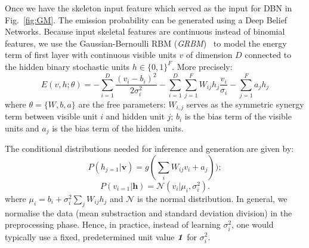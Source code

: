 Once we have the skeleton input feature \skfeature{} which served as the input \randomvariableSK{} for DBN in Fig.~\ref{fig:GM}. The emission probability \emissionprob{} can be generated using a Deep Belief Networks.
Because input skeletal features \skfeature{} are continuous instead of binomial features, we use the Gaussian-Bernoulli RBM (\emph{GRBM})~\cite{salakhutdinov2009learning} to model the energy term of first layer with continuous visible units $v$ of dimension $D$ connected to the hidden binary stochastic units $h\in \{0,1\}^F$. More precisely:
\begin{equation}
    E(v,h;\theta) =-\sum^D_{i=1} \frac{(v_i-b_i)^2}{2\sigma_i^2} -\sum^D_{i=1} \sum^F_{j=1} W_{ij}  h_j \frac{v_i}{\sigma_i}- \sum^F_{j=1}a_jh_j
\label{GRBMenergy}
\end{equation}
where $\theta=\{W,b,a\}$ are the free parameters: $W_{i,j}$ serves as the symmetric synergy term between visible unit $i$ and hidden unit $j$; $b_i$ is the bias term of the visible units and $a_j$ is the bias term of the hidden units.

The conditional distributions needed for inference and generation are given by:
\begin{equation}
    P(h_{j=1}|\textbf{v})=g(\sum_i W_{ij}v_i+a_j));
\end{equation}
\begin{equation}
    P(v_{i=1}|\textbf{h})=\mathscr{N}(v_i|\mu_i,\sigma_i^2).
\end{equation}
where $\mu_i=b_i+\sigma_i^2 \sum_j W_{ij} h_j$ and $\mathscr{N}$ is the normal distribution. In general, we normalise the data (mean substraction and standard deviation division) in the preprocessing phase. Hence, in practice, instead of learning $\sigma_i^2$, one would typically use a fixed, predetermined unit value $\textbf{\emph{1}}$ for $\sigma_i^2$.

